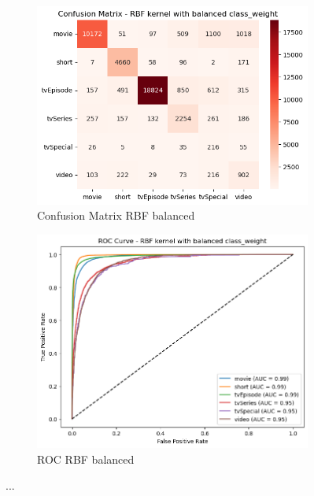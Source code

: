 \begin{figure}[h]
    \centering
    \begin{subfigure}[b]{0.48\textwidth}
        \centering
        \includegraphics[width=\textwidth]{plotsss/cm_rbf_balanced.png}
        \caption{Confusion Matrix RBF balanced}
        \label{fig:cm_rbf_balanced}
    \end{subfigure}
    \begin{subfigure}[b]{0.48\textwidth}
        \centering
        \includegraphics[width=\textwidth]{plotsss/roc_rbf_balanced.png}
        \caption{ROC RBF balanced}
        \label{fig:roc_rbf_balanced}
    \end{subfigure}
    \caption{...}  
    \label{fig:rbf_balanced_two}
\end{figure}

